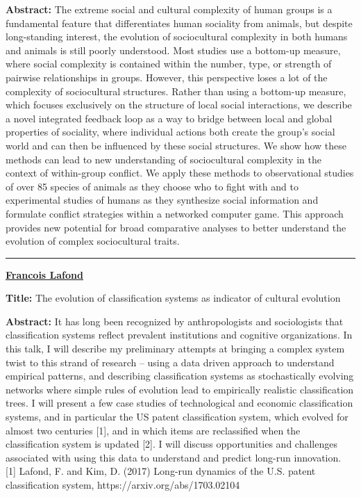 \documentclass[]{article}
\begin{document}
\textbf{Abstract:} The extreme social and cultural complexity of human
groups is a fundamental feature that differentiates human sociality from
animals, but despite long-standing interest, the evolution of
sociocultural complexity in both humans and animals is still poorly
understood. Most studies use a bottom-up measure, where social
complexity is contained within the number, type, or strength of pairwise
relationships in groups. However, this perspective loses a lot of the
complexity of sociocultural structures. Rather than using a bottom-up
measure, which focuses exclusively on the structure of local social
interactions, we describe a novel integrated feedback loop as a way to
bridge between local and global properties of sociality, where
individual actions both create the group's social world and can then be
influenced by these social structures. We show how these methods can
lead to new understanding of sociocultural complexity in the context of
within-group conflict. We apply these methods to observational studies
of over 85 species of animals as they choose who to fight with and to
experimental studies of humans as they synthesize social information and
formulate conflict strategies within a networked computer game. This
approach provides new potential for broad comparative analyses to better
understand the evolution of complex sociocultural traits.

\rule{4cm}{.4pt}

{\bf \href{https://francoislafond.info}{Francois Lafond}}

\textbf{Title:} The evolution of classification systems as indicator of
cultural evolution

\textbf{Abstract:} It has long been recognized by anthropologists and
sociologists that classification systems reflect prevalent institutions
and cognitive organizations. In this talk, I will describe my
preliminary attempts at bringing a complex system twist to this strand
of research -- using a data driven approach to understand empirical
patterns, and describing classification systems as stochastically
evolving networks where simple rules of evolution lead to empirically
realistic classification trees. I will present a few case studies of
technological and economic classification systems, and in particular the
US patent classification system, which evolved for almost two centuries
[1], and in which items are reclassified when the classification
system is updated [2]. I will discuss opportunities and challenges
associated with using this data to understand and predict long-run
innovation.\\[2\baselineskip]{[}1{]} Lafond, F. and Kim, D. (2017)
Long-run dynamics of the U.S. patent classification system,
https://arxiv.org/abs/1703.02104\\
\end{document}
